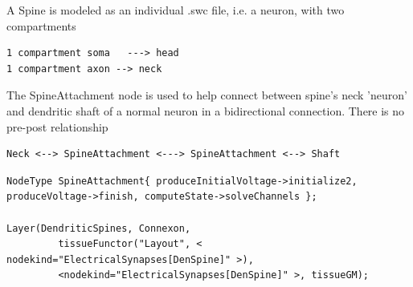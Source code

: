 A Spine is modeled as an individual .swc file, i.e. a neuron, with two
compartments	
\begin{verbatim}
1 compartment soma   ---> head
1 compartment axon --> neck
\end{verbatim}

The SpineAttachment node is used to help connect between spine's
neck 'neuron' and dendritic shaft of a normal neuron in a bidirectional
connection. There is no pre-post relationship
\begin{verbatim}
Neck <--> SpineAttachment <---> SpineAttachment <--> Shaft
\end{verbatim}

{\tiny
\begin{verbatim}
NodeType SpineAttachment{ produceInitialVoltage->initialize2, produceVoltage->finish, computeState->solveChannels };

Layer(DendriticSpines, Connexon, 
         tissueFunctor("Layout", < nodekind="ElectricalSynapses[DenSpine]" >), 
         <nodekind="ElectricalSynapses[DenSpine]" >, tissueGM);
\end{verbatim}
}

